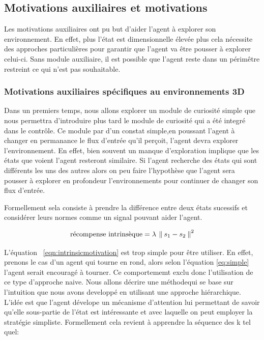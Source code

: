 \subsection{Motivations auxiliaires et motivations}

Les motivations auxiliaires ont pu but d'aider l'agent à explorer son environnement. En effet, plus l'état est dimensionnelle élevée plus cela nécessite des approches particulières pour garantir que l'agent va être pousser à explorer celui-ci. Sans module auxiliaire, il est possible que l'agent reste dans un périmêtre restreint ce qui n'est pas souhaitable.

\subsubsection{Motivations auxiliaires spécifiques au environnements 3D}

Dans un premiers temps, nous allons explorer un module de curiosité simple que nous permettra d'introduire plus tard le module de curiosité qui a été integré dans le contrôle. Ce module par d'un constat simple,en poussant l'agent à changer en permanance le flux d'entrée qu'il perçoit, l'agent devra explorer l'environnement. En effet, bien souvent un manque d'exploration implique que les états que voient l'agent resteront similaire. Si l'agent recherche des états qui sont différents les uns des autres alors on peu faire l'hypothèse que l'agent sera pousser à explorer en profondeur l'environnements pour continuer de changer son flux d'entrée.

Formellement sela consiste à prendre la différence entre deux états sucessifs et considérer leurs normes comme un signal pouvant aider l'agent.

\begin{equation}
\text{récompense intrinsèque} = \lambda \: \left\lVert\: s_1 - s_2 \:\right\rVert^2 
\label{eqn:intrinsicmotivation}
\end{equation}

L'équation ~\ref{eqn:intrinsicmotivation} est trop simple pour être utiliser. En effet, prenons le cas d'un agent qui tourne en rond, alors selon l'équation \eqref{eq:simple} l'agent serait encouragé à tourner. Ce comportememt exclu donc l'utilisation de ce type d'approche naive. Nous allons décrire une méthodequi se base sur l'intuition que nous avons developpé en utilisant une approche hiérarchique. L'idée est que l'agent dévelope un mécanisme d'attention lui permettant de savoir qu'elle sous-partie de l'état est intéressante et avec laquelle on peut employer la stratégie simpliste.
Formellement cela revient à apprendre la séquence des k tel quel:

